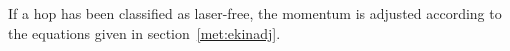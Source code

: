 \documentclass[a4paper,11pt,DIV=15,openany,twoside=false]{scrbook}
\newcommand{\tthdump}[1]{#1}
\newcommand{\E}{\ensuremath{\mathrm{e}}}
\newcommand{\I}{\ensuremath{\mathrm{i}}}
\newcommand{\VEC}[1]{\ensuremath{\mathbf{#1}}}
\begin{document}
If a hop has been classified as laser-free, the momentum is adjusted according to the equations given in section~\ref{met:ekinadj}.

% 
% 
% 
\end{document}
